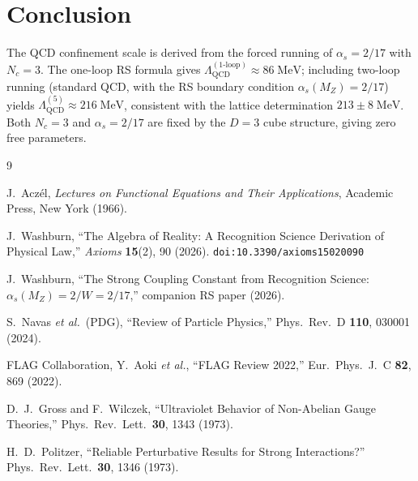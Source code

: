 \documentclass[12pt,a4paper]{article}
\theoremstyle{definition}
\theoremstyle{remark}
\begin{document}
\section{Conclusion}
\label{sec:conclusion}

The QCD confinement scale is derived from the forced running of
$\alpha_s = 2/17$ with $N_c = 3$.  The one-loop RS formula gives
$\Lambda_{\mathrm{QCD}}^{(1\text{-loop})} \approx 86\;\mathrm{MeV}$;
including two-loop running (standard QCD, with the RS boundary
condition $\alpha_s(M_Z) = 2/17$) yields
$\Lambda_{\mathrm{QCD}}^{(5)} \approx 216\;\mathrm{MeV}$, consistent
with the lattice determination $213 \pm 8\;\mathrm{MeV}$.  Both
$N_c = 3$ and $\alpha_s = 2/17$ are fixed by the $D = 3$ cube
structure, giving zero free parameters.

\begin{thebibliography}{9}

J.~Acz\'el, \emph{Lectures on Functional Equations and Their Applications},
Academic Press, New York (1966).

J.~Washburn, ``The Algebra of Reality: A Recognition Science Derivation
of Physical Law,'' \emph{Axioms} \textbf{15}(2), 90 (2026).
\texttt{doi:10.3390/axioms15020090}

J.~Washburn, ``The Strong Coupling Constant from Recognition Science:
$\alpha_s(M_Z) = 2/W = 2/17$,'' companion RS paper (2026).

S.~Navas \textit{et al.}\ (PDG), ``Review of Particle Physics,''
Phys.\ Rev.\ D \textbf{110}, 030001 (2024).

FLAG Collaboration, Y.~Aoki \textit{et al.},
``FLAG Review 2022,'' Eur.\ Phys.\ J.\ C \textbf{82}, 869 (2022).

D.~J.~Gross and F.~Wilczek, ``Ultraviolet Behavior of
Non-Abelian Gauge Theories,'' Phys.\ Rev.\ Lett.\ \textbf{30},
1343 (1973).

H.~D.~Politzer, ``Reliable Perturbative Results for Strong
Interactions?'' Phys.\ Rev.\ Lett.\ \textbf{30}, 1346 (1973).

\end{thebibliography}
\end{document}
